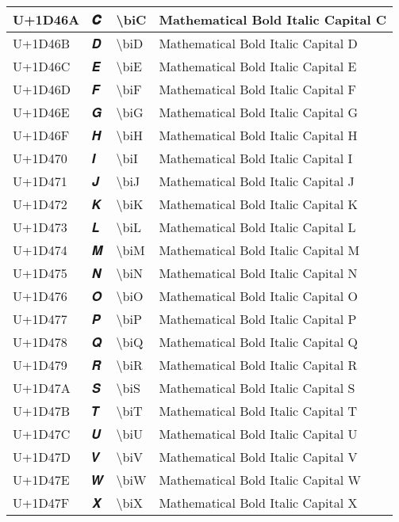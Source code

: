 \begin{table}[h]
\begin{tabulary}{\linewidth}{|L|L|L|L|}
\hline
U+1D46A & 𝑪 & {\textbackslash}biC & Mathematical Bold Italic Capital C \\
\hline
U+1D46B & 𝑫 & {\textbackslash}biD & Mathematical Bold Italic Capital D \\
\hline
U+1D46C & 𝑬 & {\textbackslash}biE & Mathematical Bold Italic Capital E \\
\hline
U+1D46D & 𝑭 & {\textbackslash}biF & Mathematical Bold Italic Capital F \\
\hline
U+1D46E & 𝑮 & {\textbackslash}biG & Mathematical Bold Italic Capital G \\
\hline
U+1D46F & 𝑯 & {\textbackslash}biH & Mathematical Bold Italic Capital H \\
\hline
U+1D470 & 𝑰 & {\textbackslash}biI & Mathematical Bold Italic Capital I \\
\hline
U+1D471 & 𝑱 & {\textbackslash}biJ & Mathematical Bold Italic Capital J \\
\hline
U+1D472 & 𝑲 & {\textbackslash}biK & Mathematical Bold Italic Capital K \\
\hline
U+1D473 & 𝑳 & {\textbackslash}biL & Mathematical Bold Italic Capital L \\
\hline
U+1D474 & 𝑴 & {\textbackslash}biM & Mathematical Bold Italic Capital M \\
\hline
U+1D475 & 𝑵 & {\textbackslash}biN & Mathematical Bold Italic Capital N \\
\hline
U+1D476 & 𝑶 & {\textbackslash}biO & Mathematical Bold Italic Capital O \\
\hline
U+1D477 & 𝑷 & {\textbackslash}biP & Mathematical Bold Italic Capital P \\
\hline
U+1D478 & 𝑸 & {\textbackslash}biQ & Mathematical Bold Italic Capital Q \\
\hline
U+1D479 & 𝑹 & {\textbackslash}biR & Mathematical Bold Italic Capital R \\
\hline
U+1D47A & 𝑺 & {\textbackslash}biS & Mathematical Bold Italic Capital S \\
\hline
U+1D47B & 𝑻 & {\textbackslash}biT & Mathematical Bold Italic Capital T \\
\hline
U+1D47C & 𝑼 & {\textbackslash}biU & Mathematical Bold Italic Capital U \\
\hline
U+1D47D & 𝑽 & {\textbackslash}biV & Mathematical Bold Italic Capital V \\
\hline
U+1D47E & 𝑾 & {\textbackslash}biW & Mathematical Bold Italic Capital W \\
\hline
U+1D47F & 𝑿 & {\textbackslash}biX & Mathematical Bold Italic Capital X \\

\end{tabulary}
\end{table}
